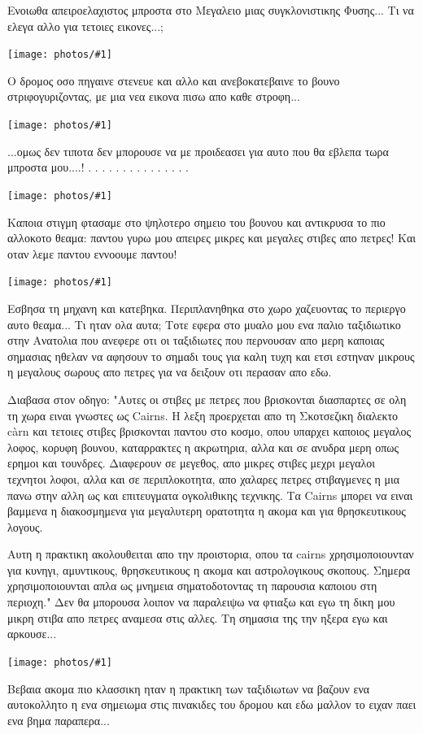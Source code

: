 \documentclass[11pt, letterpaper]{book}
\newcommand\photo[1]{\begin{center}\noindent\texttt{[image: photos/\#1]}\end{center}}
\begin{document}
Ενοιωθα απειροελαχιστος μπροστα στο Μεγαλειο μιας συγκλονιστικης Φυσης...
Τι να ελεγα αλλο για τετοιες εικονες...;

\photo{185.jpg}

Ο δρομος οσο πηγαινε στενευε και αλλο και ανεβοκατεβαινε το βουνο στριφογυριζοντας, με μια νεα εικονα πισω απο καθε στροφη...

\photo{186.jpg}

...ομως δεν τιποτα δεν μπορουσε να με προιδεασει για αυτο που θα εβλεπα τωρα μπροστα μου....!
.
.
.
.
.
.
.
.
.
.
.
.
.
.
.

\photo{187.jpg}

Καποια στιγμη φτασαμε στο ψηλοτερο σημειο του βουνου και αντικρυσα το πιο αλλοκοτο θεαμα: παντου γυρω μου απειρες μικρες και μεγαλες στιβες απο πετρες! Και οταν λεμε παντου εννοουμε παντου!

\photo{188.jpg}

Εσβησα τη μηχανη και κατεβηκα. Περιπλανηθηκα στο χωρο χαζευοντας το περιεργο αυτο θεαμα... Τι ηταν ολα αυτα; Τοτε εφερα στο μυαλο μου ενα παλιο ταξιδιωτικο στην Ανατολια που ανεφερε οτι οι ταξιδιωτες που περνουσαν απο μερη καποιας σημασιας ηθελαν να αφησουν το σημαδι τους για καλη τυχη και ετσι εστηναν μικρους η μεγαλους σωρους απο πετρες για να δειξουν οτι περασαν απο εδω.

Διαβασα στον οδηγο: "Αυτες οι στιβες με πετρες που βρισκονται διασπαρτες σε ολη τη χωρα ειναι γνωστες ως Cairns. Η λεξη προερχεται απο τη Σκοτσεζικη διαλεκτο càrn και τετοιες στιβες βρισκονται παντου στο κοσμο, οπου υπαρχει καποιος μεγαλος λοφος, κορυφη βουνου, καταρρακτες η ακρωτηρια, αλλα και σε ανυδρα μερη οπως ερημοι και τουνδρες. Διαφερουν σε μεγεθος, απο μικρες στιβες μεχρι μεγαλοι τεχνητοι λοφοι, αλλα και σε περιπλοκοτητα, απο χαλαρες πετρες στιβαγμενες η μια πανω στην αλλη ως και επιτευγματα ογκολιθικης τεχνικης. Τα Cairns μπορει να ειναι βαμμενα η διακοσμημενα για μεγαλυτερη ορατοτητα η ακομα και για θρησκευτικους λογους.

Αυτη η πρακτικη ακολουθειται απο την προιστορια, οπου τα cairns χρησιμοποιουνταν για κυνηγι, αμυντικους, θρησκευτικους η ακομα και αστρολογικους σκοπους. Σημερα χρησιμοποιουνται απλα ως μνημεια σηματοδοτοντας τη παρουσια καποιου στη περιοχη."
Δεν θα μπορουσα λοιπον να παραλειψω να φτιαξω και εγω τη δικη μου μικρη στιβα απο πετρες αναμεσα στις αλλες. Τη σημασια της την ηξερα εγω και αρκουσε...

\photo{189.jpg}

Βεβαια ακομα πιο κλασσικη ηταν η πρακτικη των ταξιδιωτων να βαζουν ενα αυτοκολλητο η ενα σημειωμα στις πινακιδες του δρομου και εδω μαλλον το ειχαν παει ενα βημα παραπερα...
\end{document}
